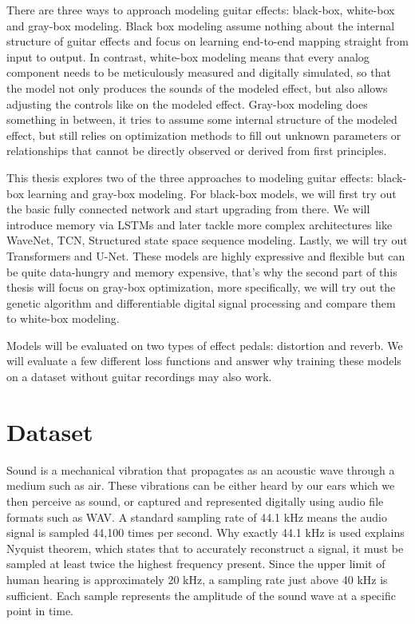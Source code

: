 \documentclass[masterthesis]{fer}
\begin{document}
There are three ways to approach modeling guitar effects: black-box, white-box and gray-box modeling. Black box modeling assume nothing about the internal structure of guitar effects and focus on learning end-to-end mapping straight from input to output. In contrast, white-box modeling means that every analog component needs to be meticulously measured and digitally simulated, so that the model not only produces the sounds of the modeled effect, but also allows adjusting the controls like on the modeled effect. Gray-box modeling does something in between, it tries to assume some internal structure of the modeled effect, but still relies on optimization methods to fill out unknown parameters or relationships that cannot be directly observed or derived from first principles. 

This thesis explores two of the three approaches to modeling guitar effects: black-box learning and gray-box modeling. For black-box models, we will first try out the basic fully connected network and start upgrading from there. We will introduce memory via LSTMs and later tackle more complex architectures like WaveNet, TCN, Structured state space sequence modeling. Lastly, we will try out Transformers and U-Net. These models are highly expressive and flexible but can be quite data-hungry and memory expensive, that's why the second part of this thesis will focus on gray-box optimization, more specifically, we will try out the genetic algorithm and differentiable digital signal processing and compare them to white-box modeling.

Models will be evaluated on two types of effect pedals: distortion and reverb. We will evaluate a few different loss functions and answer why training these models on a dataset without guitar recordings may also work.



\chapter{Dataset}
\label{sec:materialsandmethods}

Sound is a mechanical vibration that propagates as an acoustic wave through a medium such as air. These vibrations can be either heard by our ears which we then perceive as sound, or captured and represented digitally using audio file formats such as WAV. A standard sampling rate of 44.1 kHz means the audio signal is sampled 44,100 times per second. Why exactly 44.1 kHz is used explains Nyquist theorem, which states that to accurately reconstruct a signal, it must be sampled at least twice the highest frequency present. Since the upper limit of human hearing is approximately 20 kHz, a sampling rate just above 40 kHz is sufficient. Each sample represents the amplitude of the sound wave at a specific point in time.
\end{document}
